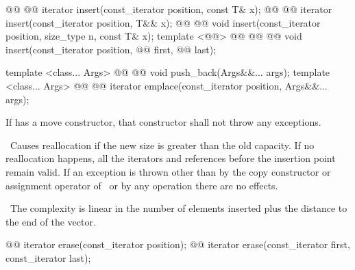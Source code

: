 \documentclass[american,twoside]{book}
\begin{document}
%
\begin{itemdecl}
@@ @@
  iterator insert(const_iterator position, const T& x);
@@ @@
  iterator insert(const_iterator position, T&& x);
@@ @@
  void insert(const_iterator position, size_type n, const T& x);
template <@@>
    @@
          @@ @@
    void insert(const_iterator position,
                @@ first, @@ last);

template <class... Args> 
  @@
        @@
  void push_back(Args&&... args);
template <class... Args> 
  @@
        @@
  iterator emplace(const_iterator position, Args&&... args);
\end{itemdecl}

\begin{itemdescr}
\pnum
\requires If  has a move constructor, that
constructor shall not throw any exceptions.

\pnum
\notes\ 
Causes reallocation if the new size is greater than the old capacity.
If no reallocation happens, all the iterators and references before the insertion point remain valid.
If an exception is thrown other than by
the copy constructor or assignment operator of
\ or by any  operation
there are no effects.

\pnum
\complexity\ 
The complexity is linear in the number of elements inserted plus the distance
to the end of the vector.
\end{itemdescr}

%
\begin{itemdecl}
@@ iterator erase(const_iterator position);
@@ iterator erase(const_iterator first, const_iterator last);
\end{itemdecl}
\end{document}
